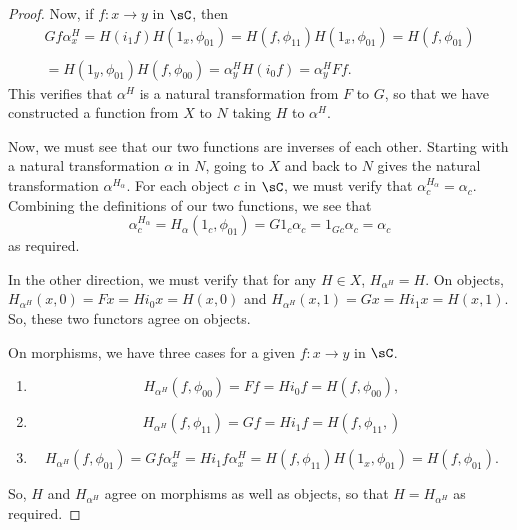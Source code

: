 \documentclass[main.tex]{subfiles}
\begin{document}
\begin{proof}
	Now, if $f:x\rightarrow y$ in $\sC$, then
	\[\begin{array}{l}Gf\alpha^H_x=H(i_1f)H(1_x,\phi_{01})=H(f,\phi_{11})
			H(1_x,\phi_{01})=H(f,\phi_{01})\\
	\\=H(1_y,\phi_{01})H(f,\phi_{00})=\alpha^H_yH(i_0f)=\alpha^H_yFf.
	\end{array}\]
	This verifies that $\alpha^H$ is a natural transformation from $F$ to $G$,
	so that we have constructed a function from $X$ to $N$ taking $H$ to
	$\alpha^H$.

	Now, we must see that our two functions are inverses of each other. Starting
	with a natural transformation $\alpha$ in $N$, going to $X$ and back to $N$
	gives the natural transformation $\alpha^{H_\alpha}$. For each object $c$ in
	$\sC$, we must verify that $\alpha^{H_\alpha}_c=\alpha_c$. Combining the
	definitions of our two functions, we see that
	\[\alpha^{H_\alpha}_c=H_\alpha(1_c,\phi_{01})=G1_c\alpha_c=1_{Gc}\alpha_c=\alpha_c\]
	as required.

	In the other direction, we must verify that for any $H\in X$,
	$H_{\alpha^H}=H$. On objects, $H_{\alpha^H}(x,0)=Fx=Hi_0x=H(x,0)$ and
	$H_{\alpha^H}(x,1)=Gx=Hi_1x=H(x,1)$. So, these two functors agree on
	objects.

	On morphisms, we have three cases for a given $f:x\rightarrow y$ in $\sC$.
	\begin{enumerate}
		\item
			\[H_{\alpha^H}(f,\phi_{00})=Ff=Hi_0f=H(f,\phi_{00}),\]
		\item
			\[H_{\alpha^H}(f,\phi_{11})=Gf=Hi_1f=H(f,\phi_{11},)\]
		\item
			\[H_{\alpha^H}(f,\phi_{01})=Gf\alpha^H_x=Hi_1f\alpha^H_x=H(f,\phi_{11})H(1_x,\phi_{01})=H(f,\phi_{01}).\]
	\end{enumerate}
	So, $H$ and $H_{\alpha^H}$ agree on morphisms as well as objects, so that
	$H=H_{\alpha^H}$ as required.
\end{proof}
\end{document}
